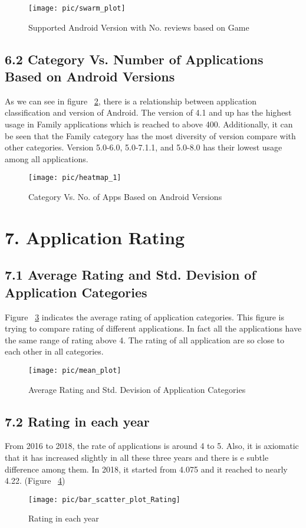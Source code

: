 \documentclass{article}
\begin{document}
\begin{figure}
\centering
\texttt{[image: pic/swarm\_plot]}
\caption{Supported Android Version with No. reviews based on Game}
\label{fig:5}
\end{figure}

\subsection*{6.2 Category Vs. Number of Applications Based on Android Versions}
As we can see in figure ~\ref{fig:12}, there is a relationship between application classification and version of Android. The version of 4.1 and up has the highest usage in Family applications which is reached to above 400. Additionally, it can be seen that the Family category has the most diversity of version compare with other categories. Version 5.0-6.0, 5.0-7.1.1, and 5.0-8.0 has their lowest usage among all applications.
\begin{figure}
\centering
\texttt{[image: pic/heatmap\_1]}
\caption{Category Vs. No. of Apps Based on Android Versions} 
\label{fig:12}
\end{figure}

\section*{7. Application Rating}
\subsection*{7.1 Average Rating and Std. Devision of Application Categories}
Figure ~\ref{fig:6} indicates the average rating of application categories. This figure is trying to compare rating of different applications. In fact all the applications have the same range of rating above 4. The rating of all application are so close to each other in all categories.
\begin{figure}
\centering
\texttt{[image: pic/mean\_plot]}
\caption{Average Rating and Std. Devision of Application Categories} 
\label{fig:6}
\end{figure}

\subsection*{7.2 Rating in each year}
From 2016 to 2018, the rate of applications is around 4 to 5. Also, it is axiomatic that it has increased slightly in all these three years and there is e subtle difference among them. In 2018, it started from 4.075 and it reached to nearly 4.22. (Figure ~\ref{fig:7})
\begin{figure}
\centering
\texttt{[image: pic/bar\_scatter\_plot\_Rating]}
\caption{Rating in each year} 
\label{fig:7}
\end{figure}
\end{document}
